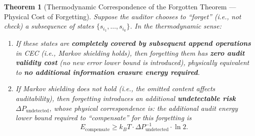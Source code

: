 \documentclass[12pt,a4paper]{article}
\theoremstyle{plain}
\newtheorem{theorem}{Theorem}[section]
\theoremstyle{definition}
\newcommand{\kB}{k_{\!B}}
\begin{document}
\begin{theorem}[Thermodynamic Correspondence of the Forgotten Theorem --- Physical Cost of Forgetting]
\label{thm:forgotten_thermo}
Suppose the auditor chooses to ``forget'' (i.e., not check) a subsequence of states $\{s_{i_1}, \ldots, s_{i_k}\}$.
In the thermodynamic sense:
\begin{enumerate}
    \item If these states are \textbf{completely covered by subsequent append operations} in CEC (i.e., Markov shielding holds),
    then forgetting them has \textbf{zero audit validity cost} (no new error lower bound is introduced),
    physically equivalent to \textbf{no additional information erasure energy required}.

    \item If Markov shielding does not hold (i.e., the omitted content affects auditability),
    then forgetting introduces an additional \textbf{undetectable risk} $\Delta P_{\text{undetected}}$,
    whose physical correspondence is: the additional audit energy lower bound required to ``compensate'' for this forgetting is
    \begin{equation}\label{eq:forgotten_cost}
    E_{\text{compensate}} \geq \kB T \cdot \Delta P_{\text{undetected}}^{-1} \cdot \ln 2.
    \end{equation}
\end{enumerate}
\end{theorem}
\end{document}
